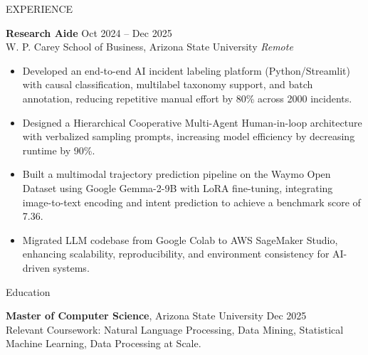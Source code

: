 \documentclass{resume} %
\begin{document}
\begin{rSection}{EXPERIENCE}

\textbf{Research Aide} \hfill Oct 2024 -- Dec 2025\\
W. P. Carey School of Business, Arizona State University \hfill \textit{Remote}
 \begin{itemize}
    \itemsep -3pt {}
     \item Developed an end-to-end AI incident labeling platform (Python/Streamlit) with causal classification, multilabel taxonomy support, and batch annotation, reducing repetitive manual effort by 80\% across 2000 incidents.
     \item Designed a Hierarchical Cooperative Multi-Agent Human-in-loop architecture with verbalized sampling prompts, increasing model efficiency by decreasing runtime by 90\%.
     \item Built a multimodal trajectory prediction pipeline on the Waymo Open Dataset using Google Gemma-2-9B with LoRA fine-tuning, integrating image-to-text encoding and intent prediction to achieve a benchmark score of 7.36.
     \item Migrated LLM codebase from Google Colab to AWS SageMaker Studio, enhancing scalability, reproducibility, and environment consistency for AI-driven systems.
 \end{itemize}

\end{rSection}

\begin{rSection}{Education}

{\bf Master of Computer Science}, Arizona State University \hfill {Dec 2025}\\
Relevant Coursework: Natural Language Processing, Data Mining, Statistical Machine Learning, Data Processing at Scale.

\end{rSection}
\vspace{-5 pt}
\end{document}
